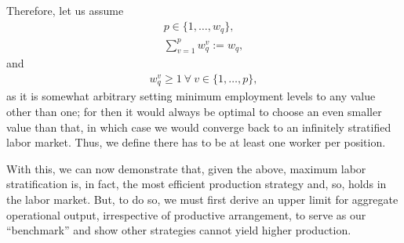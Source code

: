 \documentclass[hidelinks, nonatbib]{elsarticle}
\begin{document}
\begin{axiom}
    Therefore, let us assume
    \begin{gather}
    p \in \{1, \dots, w_q\}
    ,
    \\
    \sum_{v=1}^{p}
    w_{q}^{v}
    :=
    w_q
    ,
    \end{gather}
    and
    \begin{gather}
    w_{q}^{v}
    \geq
    1
    \
    \forall
    \
    v \in \{1, \dots, p\}
    ,
    \end{gather}
    as it is somewhat arbitrary setting minimum employment levels to any value other than one; for then it would always be optimal to choose an even smaller value than that, in which case we would converge back to an infinitely stratified labor market. Thus, we define there has to be at least one worker per position.
\end{axiom}

With this, we can now demonstrate that, given the above, maximum labor stratification is, in fact, the most efficient production strategy and, so, holds in the labor market. But, to do so, we must first derive an upper limit for aggregate operational output, irrespective of productive arrangement, to serve as our ``benchmark'' and show other strategies cannot yield higher production.
\end{document}
